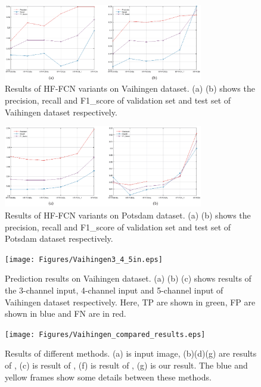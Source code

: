 \begin{figure}
\centering
\includegraphics[width=8.7cm]{Figures/vaihingen_variants.eps}
\caption{Results of HF-FCN variants on Vaihingen dataset. (a) (b) shows the precision, recall and F1\_score of validation set and test set of Vaihingen dataset respectively.}
\label{fig:Vaihingen-variants}
\end{figure}

\begin{figure}
\centering
\includegraphics[width=8.7cm]{Figures/Potsdam_variants.eps}
\caption{Results of HF-FCN variants on Potsdam dataset. (a) (b) shows the precision, recall and F1\_score of validation set and test set of Potsdam dataset respectively.}
\label{fig:Potsdam-variants}
\end{figure}

\begin{figure}
\setlength{\abovecaptionskip}{-10pt}
\setlength{\belowcaptionskip}{-10pt}
\centering
\texttt{[image: Figures/Vaihingen3\_4\_5in.eps]}
\caption{Prediction results on Vaihingen dataset. (a) (b) (c) shows results of the 3-channel input, 4-channel input and 5-channel input of Vaihingen dataset respectively. Here, TP are shown in green, FP are shown in blue and FN are in red.}
\label{fig:Vaihingen-3-4-5in}
\end{figure}

\begin{figure}
\centering
\texttt{[image: Figures/Vaihingen\_compared\_results.eps]}
\caption{Results of different methods. (a) is input image, (b)(d)(g) are results of \cite{IEEEexample:audebert2017deep}, (c) is result of \cite{IEEEexample:marmanis2016semantic}, (f) is result of \cite{IEEEexample:unknown}, (g) is our result. The blue and yellow frames show some details between these methods.}
\label{fig:Vaihingen-compared-others}
\end{figure}

